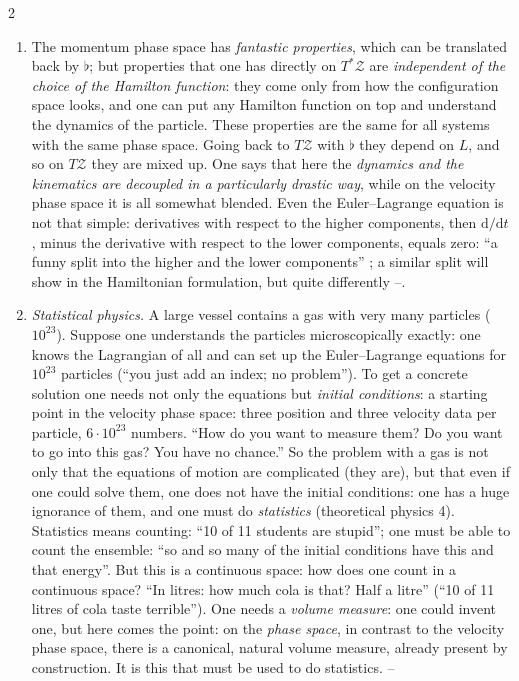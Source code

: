 \begin{paracol}{2}
\begin{enumerate}
  \item The momentum phase space has \emph{fantastic properties}, which can be translated back by $\flat$; but properties that one has directly on $T^*\mathcal Z$ are \emph{independent of the choice of the Hamilton function}: they come only from how the configuration space looks, and one can put any Hamilton function on top and understand the dynamics of the particle. These properties are the same for all systems with the same phase space. Going back to $T\mathcal Z$ with $\flat$ they depend on $L$, and so on $T\mathcal Z$ they are mixed up. One says that here the \emph{dynamics and the kinematics are decoupled in a particularly drastic way}, while on the velocity phase space it is all somewhat blended. Even the Euler--Lagrange equation is not that simple: derivatives with respect to the higher components, then $\mathrm d/\mathrm dt$, minus the derivative with respect to the lower components, equals zero: ``a funny split into the higher and the lower components'' ; a similar split will show in the Hamiltonian formulation, but quite differently --.
  \item \emph{Statistical physics.} A large vessel contains a gas with very many particles ($10^{23}$). Suppose one understands the particles microscopically exactly: one knows the Lagrangian of all and can set up the Euler--Lagrange equations for $10^{23}$ particles (``you just add an index; no problem''). To get a concrete solution one needs not only the equations but \emph{initial conditions}: a starting point in the velocity phase space: three position and three velocity data per particle, $6\cdot10^{23}$ numbers. ``How do you want to measure them? Do you want to go into this gas? You have no chance.'' So the problem with a gas is not only that the equations of motion are complicated (they are), but that even if one could solve them, one does not have the initial conditions: one has a huge ignorance of them, and one must do \emph{statistics} (theoretical physics 4). Statistics means counting: ``10 of 11 students are stupid''; one must be able to count the ensemble: ``so and so many of the initial conditions have this and that energy''. But this is a continuous space: how does one count in a continuous space? ``In litres: how much cola is that? Half a litre'' (``10 of 11 litres of cola taste terrible''). One needs a \emph{volume measure}: one could invent one, but here comes the point: on the \emph{phase space}, in contrast to the velocity phase space, there is a canonical, natural volume measure, already present by construction. It is this that must be used to do statistics. --

\end{enumerate}
\end{paracol}
